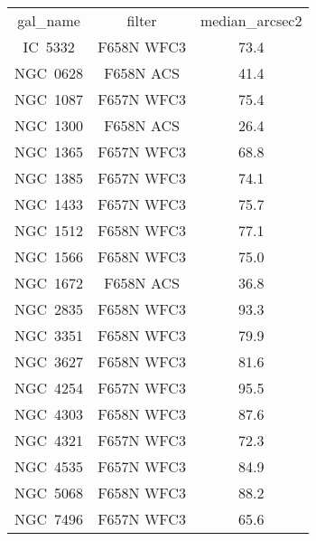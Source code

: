 \begin{table}
\begin{tabular}{ccc}
gal_name & filter & median_arcsec2 \\
IC~5332 & F658N WFC3 & 73.4 \\
NGC~0628 & F658N ACS & 41.4 \\
NGC~1087 & F657N WFC3 & 75.4 \\
NGC~1300 & F658N ACS & 26.4 \\
NGC~1365 & F657N WFC3 & 68.8 \\
NGC~1385 & F657N WFC3 & 74.1 \\
NGC~1433 & F657N WFC3 & 75.7 \\
NGC~1512 & F658N WFC3 & 77.1 \\
NGC~1566 & F658N WFC3 & 75.0 \\
NGC~1672 & F658N ACS & 36.8 \\
NGC~2835 & F658N WFC3 & 93.3 \\
NGC~3351 & F658N WFC3 & 79.9 \\
NGC~3627 & F658N WFC3 & 81.6 \\
NGC~4254 & F657N WFC3 & 95.5 \\
NGC~4303 & F658N WFC3 & 87.6 \\
NGC~4321 & F657N WFC3 & 72.3 \\
NGC~4535 & F657N WFC3 & 84.9 \\
NGC~5068 & F658N WFC3 & 88.2 \\
NGC~7496 & F657N WFC3 & 65.6 \\
\end{tabular}
\end{table}

